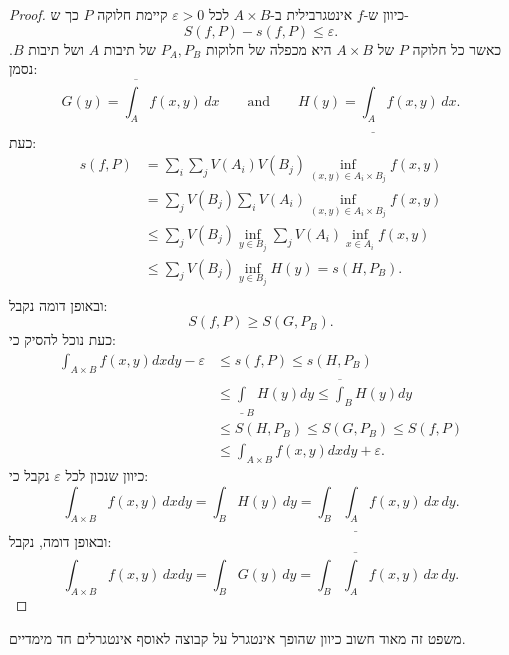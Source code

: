 \documentclass{tstextbook}
\begin{document}
\begin{proof}
כיוון ש-\(f\) אינטגרבילית ב-\(A\times B\) לכל \(\varepsilon>0\) קיימת חלוקה \(P\) כך ש-
$$S\left(f,P\right)-s(f,P)\leq\varepsilon.$$
כאשר כל חלוקה \(P\) של \(A\times B\) היא מכפלה של חלוקות \(P_{A},P_{B}\) של תיבות \(A\) ושל תיבות \(B\). נסמן:
$$G(y)=\overline{{{\int_{A}}}}f(x,y)\,d x\qquad{\mathrm{and}}\qquad H(y)=\underline{{{\int_{A}}}}f(x,y)\,d x.$$
כעת:
$$\begin{aligned} {{s ( f, P )}} & {{} {{} {} {} {{}=} \sum_{i} \sum_{j} V ( A_{i} ) V ( B_{j} ) \operatorname* {i n f}_{( x, y ) \in A_{i} \times B_{j}} f ( x, y )}} \\ {{}} & {{} {{} {{}=\sum_{j} V ( B_{j} ) \sum_{i} V ( A_{i} ) \operatorname* {i n f}_{( x, y ) \in A_{i} \times B_{j}} f ( x, y )}}} \\ {{}} & {{} {{} {{} \leq\sum_{j} V ( B_{j} ) \operatorname* {i n f}_{y \in B_{j}} \sum_{j} V ( A_{i} ) \operatorname* {i n f}_{x \in A_{i}} f ( x, y )}}} \\ {{}} & {{} {{} {{} \leq\sum_{j} V ( B_{j} ) \operatorname* {i n f}_{y \in B_{j}} H ( y )=s ( H, P_{B} ).}}} \\ \end{aligned}
$$
ובאופן דומה נקבל:
$$S\left(f,P\right)\geq S\left(G,P_{B}\right).$$
כעת נוכל להסיק כי:
$$\begin{aligned}\int_{A\times B}f(x,y) dxdy-\varepsilon & \leq s(f,P)\leq s(H,P_{B}) \\&\leq\underline{\int}_{B}H(y) dy\leq\overline{\int}_{B}H(y) dy \\&\leq S\left(H,P_{B}\right)\leq S\left(G,P_{B}\right)\leq S\left(f,P\right) \\&\leq\int_{A\times B}f(x,y) dxdy+\varepsilon.
\end{aligned}$$
כיוון שנכון לכל \(\varepsilon\) נקבל כי:
$$\int_{A\times B}f(x,y)\,d x d y=\int_{B}H(y)\,d y=\int_{B}{\underline{{\int_{A}}}}f(x,y)\,d x\,d y.$$
ובאופן דומה, נקבל:
$$\int_{A\times B}f(x,y)\,d x d y=\int_{B}G(y)\,d y=\int_{B}{\overline{{\int_{A}}}}f(x,y)\,d x\,d y.$$

\end{proof}
משפט זה מאוד חשוב כיוון שהופך אינטגרל על קבוצה לאוסף אינטגרלים חד מימדיים.
\end{document}
